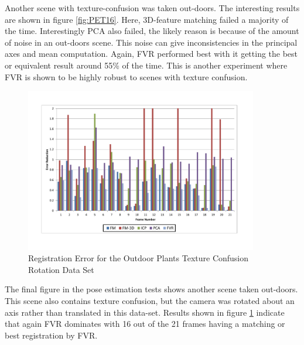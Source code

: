 Another scene with texture-confusion was taken out-doors. The interesting results are shown in figure \ref{fig:PET16}. Here, 3D-feature matching failed a majority of the time. Interestingly PCA also failed, the likely reason is because of the amount of noise in an out-doors scene. This noise can give inconsistencies in the principal axes and mean computation. Again, FVR performed best with it getting the best or equivalent result around 55\% of the time. This is another experiment where FVR is shown to be highly robust to scenes with texture confusion. 

\begin{figure}[!htb]
\centering
\includegraphics[width=4.0in]{images/results/Plants_Outdoors_Texture_Confusion_Rotation}
\caption{Registration Error for the Outdoor Plants Texture Confusion Rotation Data Set}
\label{fig:PET17}
\end{figure}

The final figure in the pose estimation tests shows another scene taken out-doors. This scene also contains texture confusion, but the camera was rotated about an axis rather than translated in this data-set. Results shown in figure \ref{fig:PET17} indicate that again FVR dominates with 16 out of the 21 frames having a matching or best registration by FVR. 
